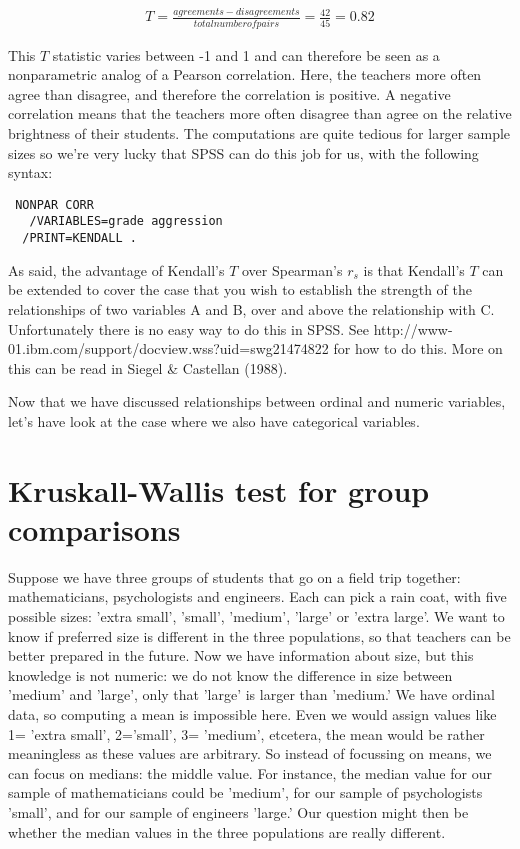   \begin{eqnarray}
  T= \frac { agreements - disagreements }{total number of pairs} = \frac{42} {45} = 0.82
  \end{eqnarray}

This $T$ statistic varies between -1 and 1 and can therefore be seen as a nonparametric analog of a Pearson correlation. Here, the teachers more often agree than disagree, and therefore the correlation is positive. A negative correlation means that the teachers more often disagree than agree on the relative brightness of their students. 
The computations are quite tedious for larger sample sizes so we're very lucky that SPSS can do this job for us, with the following syntax:


 \begin{verbatim}
 NONPAR CORR 
   /VARIABLES=grade aggression 
  /PRINT=KENDALL .
 \end{verbatim}


As said, the advantage of Kendall's $T$ over Spearman's $r_s$ is that Kendall's $T$ can be extended to cover the case that you wish to establish the strength of the relationships of two variables A and B, over and above the relationship with C. Unfortunately there is no easy way to do this in SPSS. See http://www-01.ibm.com/support/docview.wss?uid=swg21474822 for how to do this. More on this can be read in Siegel \& Castellan (1988).

        
Now that we have discussed relationships between ordinal and numeric variables, let's have look at the case where we also have categorical variables.


\section{Kruskall-Wallis test for group comparisons}


Suppose we have three groups of students that go on a field trip together: mathematicians, psychologists and engineers. Each can pick a rain coat, with five possible sizes: 'extra small', 'small', 'medium', 'large' or 'extra large'. We want to know if preferred size is different in the three populations, so that teachers can be better prepared in the future. Now we have information about size, but this knowledge is not numeric: we do not know the difference in size between 'medium' and 'large', only that 'large' is larger than 'medium.' We have ordinal data, so computing a mean is impossible here. Even we would assign values like 1= 'extra small', 2='small', 3= 'medium', etcetera, the mean would be rather meaningless as these values are arbitrary. So instead of focussing on means, we can focus on medians: the middle value. For instance, the median value for our sample of mathematicians could be 'medium', for our sample of psychologists 'small', and for our sample of engineers 'large.' Our question might then be whether the median values in the three populations are really different. 


